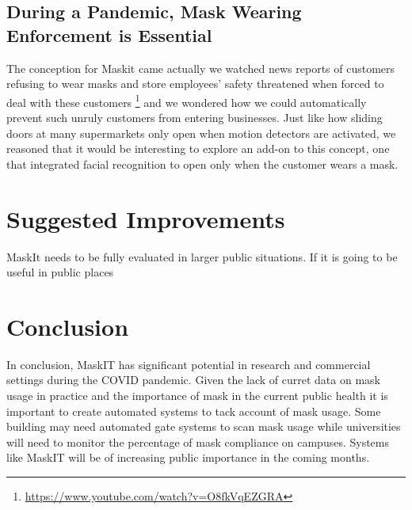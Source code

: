 \documentclass[conference, 12pt, onecolumn]{IEEEtran}
\begin{document}
\subsection{During a Pandemic, Mask Wearing Enforcement is Essential}
The conception for Maskit came actually we watched news reports of customers refusing to wear masks and store employees' safety threatened when forced to deal with these customers \footnote{\url{https://www.youtube.com/watch?v=O8fkVqEZGRA}} and we wondered how we could automatically prevent such unruly customers from entering businesses. Just like how sliding doors at many supermarkets only open when motion detectors are activated, we reasoned that it would be interesting to explore an add-on to this concept, one that integrated facial recognition to open only when the customer wears a mask. 
\section{Suggested Improvements}
MaskIt needs to be fully evaluated in larger public situations. If it is going to be useful in public places 
\section{Conclusion}
In conclusion, MaskIT has significant potential in research and commercial settings during the COVID pandemic. Given the lack of curret data on mask usage in practice and the importance of mask in the current public health it is important to create automated systems to tack account of mask usage. Some building may need automated gate systems to scan mask usage while universities will need to monitor the percentage of mask compliance on campuses. Systems like MaskIT will be of increasing public importance in the coming months. 



\end{document}
